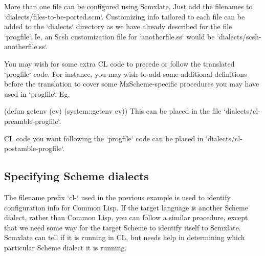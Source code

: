 More than one file can be configured using
Scmxlate.  Just add the filenames to
`dialects/files-to-be-ported.scm`.  Customizing info
tailored to each file can be added to the `dialects`
directory as we have already described for the
file `progfile`.  Ie, an Scsh customization file
for `anotherfile.ss` would be
`dialects/scsh-anotherfile.ss`.

\iffalse
This kind of definition replacement is particularly
useful when the target language is Common Lisp.
For instance, let’s say `progfile` contains
the definition

\begintts
(define lassoc
  (lambda (k al equ?)
    (let loop ((al al))
      (if (null? al) #f
          (let ((c (car al)))
            (if (equ? (car c) k) c
                (loop (cdr al))))))))
\endtt

Scmxlate will provide a complicated if working
Common Lisp translation of the above code, but it
will not be as simple as

\begintts
(defun lassoc (k al equ?)
  (assoc k al :test equ?))
\endtt

You can put this latter definition in
`dialects/cl-progfile` — where the symbol \q{cl}
stands for Common Lisp — and it will be used in
preference to the default translation.
\fi

You may wish for some extra CL code to precede or
follow the translated `progfile` code.  For instance,
you may wish to add some additional definitions before
the translation to cover some MzScheme-specific
procedures you may have used in `progfile`.  Eg,

\begintts
(defun getenv (ev)
  (system::getenv ev))
\endtt
This can be placed in the file
`dialects/cl-preamble-progfile`.

CL code you want following the `progfile` code can be
placed in `dialects/cl-postamble-progfile`.

\subsection{Specifying Scheme dialects}

The filename prefix `cl-` used in the previous
example is used to identify configuration info
for Common Lisp.  If the target language is another
Scheme dialect, rather than Common Lisp, you can follow
a similar procedure, except that we need some way for
the target Scheme to identify itself to Scmxlate.
Scmxlate can tell if it is running in CL, but
needs help in determining which particular Scheme
dialect it is running.

